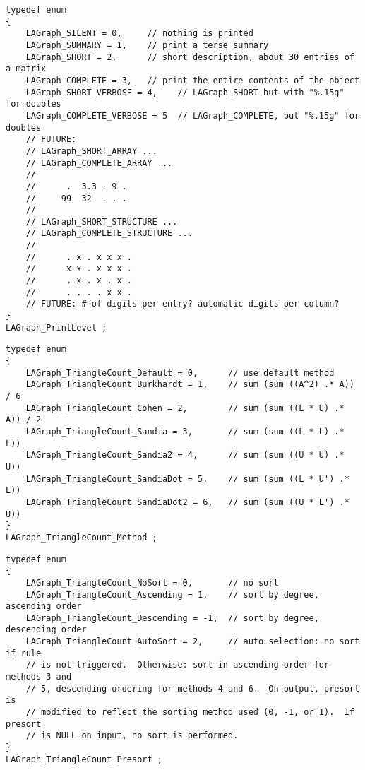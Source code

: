 \begin{verbatim}
typedef enum
{
    LAGraph_SILENT = 0,     // nothing is printed
    LAGraph_SUMMARY = 1,    // print a terse summary
    LAGraph_SHORT = 2,      // short description, about 30 entries of a matrix
    LAGraph_COMPLETE = 3,   // print the entire contents of the object
    LAGraph_SHORT_VERBOSE = 4,    // LAGraph_SHORT but with "%.15g" for doubles
    LAGraph_COMPLETE_VERBOSE = 5  // LAGraph_COMPLETE, but "%.15g" for doubles
    // FUTURE:
    // LAGraph_SHORT_ARRAY ...
    // LAGraph_COMPLETE_ARRAY ...
    //
    //      .  3.3 . 9 .
    //     99  32  . . .
    //
    // LAGraph_SHORT_STRUCTURE ...
    // LAGraph_COMPLETE_STRUCTURE ...
    //
    //      . x . x x x .
    //      x x . x x x .
    //      . x . x . x .
    //      . . . . x x .
    // FUTURE: # of digits per entry? automatic digits per column?
}
LAGraph_PrintLevel ;
\end{verbatim}




\begin{verbatim}
typedef enum
{
    LAGraph_TriangleCount_Default = 0,      // use default method
    LAGraph_TriangleCount_Burkhardt = 1,    // sum (sum ((A^2) .* A)) / 6
    LAGraph_TriangleCount_Cohen = 2,        // sum (sum ((L * U) .* A)) / 2
    LAGraph_TriangleCount_Sandia = 3,       // sum (sum ((L * L) .* L))
    LAGraph_TriangleCount_Sandia2 = 4,      // sum (sum ((U * U) .* U))
    LAGraph_TriangleCount_SandiaDot = 5,    // sum (sum ((L * U') .* L))
    LAGraph_TriangleCount_SandiaDot2 = 6,   // sum (sum ((U * L') .* U))
}
LAGraph_TriangleCount_Method ;
\end{verbatim}




\begin{verbatim}
typedef enum
{
    LAGraph_TriangleCount_NoSort = 0,       // no sort
    LAGraph_TriangleCount_Ascending = 1,    // sort by degree, ascending order
    LAGraph_TriangleCount_Descending = -1,  // sort by degree, descending order
    LAGraph_TriangleCount_AutoSort = 2,     // auto selection: no sort if rule
    // is not triggered.  Otherwise: sort in ascending order for methods 3 and
    // 5, descending ordering for methods 4 and 6.  On output, presort is
    // modified to reflect the sorting method used (0, -1, or 1).  If presort
    // is NULL on input, no sort is performed.
}
LAGraph_TriangleCount_Presort ;
\end{verbatim}




